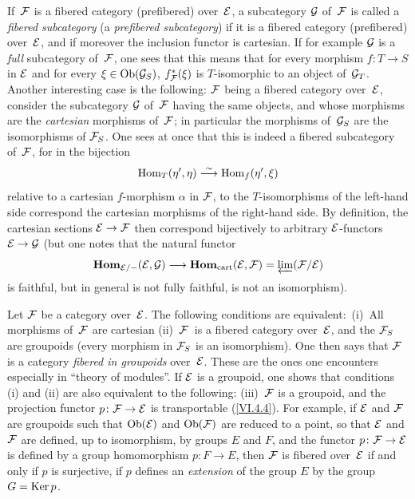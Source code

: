 If~$\cal{F}$ is a fibered category
(\resp prefibered) over~$\cal{E}$, a subcategory
$\cal{G}$ of~$\cal{F}$ is called a \emph{fibered subcategory}
(\resp a \emph{prefibered subcategory}) if it is a
fibered category (\resp prefibered) over~$\cal{E}$, and
if moreover the inclusion functor is cartesian. If for example
$\cal{G}$ is a \emph{full} subcategory of~$\cal{F}$, one
sees that this means that for every morphism $f\colon T\to S$ in
$\cal{E}$ and for every $\xi \in \Ob(\cal{G}_S)$, $f^*_{\cal{F}}(\xi)$
is $T$-isomorphic to an object of~$\cal{G}_T$. Another
interesting case is the following: $\cal{F}$ being a
fibered category over~$\cal{E}$, consider the subcategory
$\cal{G}$ of~$\cal{F}$ having the same objects, and whose morphisms
are the \emph{cartesian} morphisms of~$\cal{F}$; in particular
the morphisms of~$\cal{G}_S$ are the isomorphisms of
$\cal{F}_S$. One sees at once that this is indeed a fibered subcategory
of~$\cal{F}$, for in the bijection
$$
\Hom_T(\eta',\eta) \isomto \Hom_f(\eta',\xi)
$$
relative to a cartesian $f$-morphism $\alpha$ in $\cal{F}$,
to the $T$-isomorphisms of the left-hand side correspond the cartesian
morphisms of the right-hand side. By definition, the cartesian
sections $\cal{E}\to\cal{F}$
then correspond bijectively to arbitrary $\cal{E}$-functors
$\cal{E}\to\cal{G}$ (but one notes that the natural functor
$$
\SheafHom_{\cal{E}/-}(\cal{E},\cal{G})\to
\SheafHom_\cart(\cal{E},\cal{F})=
\varprojLim(\cal{F}/\cal{E})
$$
is faithful, but in general is not fully
faithful, \ie is not an isomorphism).

\begin{remarks}
Let $\cal{F}$ be a category over~$\cal{E}$. The following
conditions are equivalent:~(i)~All morphisms of~$\cal{F}$
are cartesian (ii)~$\cal{F}$~is a fibered category
over~$\cal{E}$, and the $\cal{F}_S$ are groupoids
(\ie every morphism in $\cal{F}_S$ is an isomorphism). One
then says that $\cal{F}$ is a category \emph{fibered in
groupoids}
over~$\cal{E}$. These are the ones one encounters especially in ``theory
of modules''. If $\cal{E}$ is a groupoid, one shows that
conditions (i) and (ii) are also equivalent to the following:
(iii)~$\cal{F}$ is a groupoid, and the projection functor
$p\colon \cal{F}\to\cal{E}$ is transportable (\cf \ref{VI.4.4}). For
example, if $\cal{E}$ and $\cal{F}$ are groupoids such that
$\Ob(\cal{E})$ and $\Ob(\cal{F})$
are reduced to a point, so that $\cal{E}$ and $\cal{F}$
are defined, up to isomorphism, by groups $E$ and
$F$, and the functor $p\colon \cal{F}\to\cal{E}$ is defined by a
group homomorphism $p\colon F\to E$, then $\cal{F}$ is
fibered over~$\cal{E}$ if and only if $p$ is surjective, \ie if
$p$ defines an \emph{extension} of the group $E$ by the group $G =
\Ker p$.
\end{remarks}

